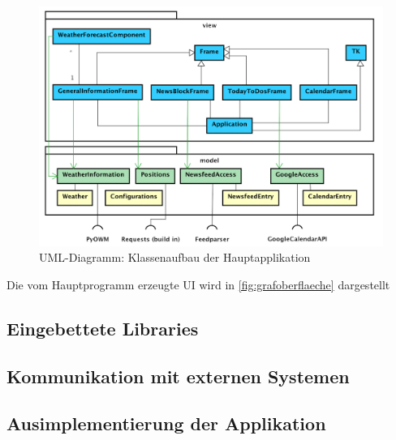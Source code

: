 \begin{figure}
	\centering
	\includegraphics[width=0.7\linewidth]{bilder/umlDiagramNoBackground}
	\caption[UML-Diagramm: Klassenaufbau der Hauptapplikation]{UML-Diagramm: Klassenaufbau der Hauptapplikation}
	\label{fig:umldiagramClasses}
\end{figure}

Die vom Hauptprogramm erzeugte UI wird in \autoref{fig:grafoberflaeche} dargestellt

\subsection{Eingebettete Libraries}

\subsection{Kommunikation mit externen Systemen}

\subsection{Ausimplementierung der Applikation}